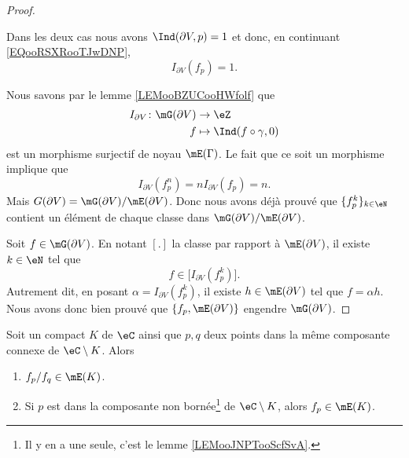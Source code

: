 \begin{proof}
\begin{subproof}
    \end{subproof}
    Dans les deux cas nous avons \( \Ind(\partial V, p)=1\) et donc, en continuant \eqref{EQooRSXRooTJwDNP},
    \begin{equation}
        I_{\partial V}(f_p)=1.
    \end{equation}

    Nous savons par le lemme \ref{LEMooBZUCooHWfolf} que
    \begin{equation}
        \begin{aligned}
            I_{\partial V}\colon \mG(\partial V)&\to \eZ \\
            f&\mapsto \Ind(f\circ \gamma,0) 
        \end{aligned}
    \end{equation}
    est un morphisme surjectif de noyau \( \mE(\Gamma)\). Le fait que ce soit un morphisme implique que
    \begin{equation}
        I_{\partial V}(f_p^n)=nI_{\partial V}(f_p)=n.
    \end{equation}
    Mais \( G(\partial V)=\mG(\partial V)/\mE(\partial V)\). Donc nous avons déjà prouvé que \( \{ f_p^k \}_{k\in \eN}\) contient un élément de chaque classe dans \( \mG(\partial V)/\mE(\partial V)\).

    Soit \( f\in \mG(\partial V)\). En notant \( [.]\) la classe par rapport à \( \mE(\partial V)\), il existe \( k\in \eN\) tel que
    \begin{equation}
        f\in\big[ I_{\partial V}(f_p^k) \big].
    \end{equation}
    Autrement dit, en posant \( \alpha=I_{\partial V}(f_p^k)\), il existe \( h\in \mE(\partial V)\) tel que \( f=\alpha h\). Nous avons donc bien prouvé que \( \{ f_p,\mE(\partial V) \}\) engendre \( \mG(\partial V)\).
\end{proof}

\begin{proposition}       \label{PROPooJNZQooLWDKww}
    Soit un compact \( K\) de \( \eC\) ainsi que \( p,q\) deux points dans la même composante connexe de \( \eC\setminus K\). Alors
    \begin{enumerate}
        \item       \label{ITEMooQMKOooQHhUGn}
            \( f_p/f_q\in\mE(K)\).
        \item
            Si \( p\) est dans la composante non bornée\footnote{Il y en a une seule, c'est le lemme \ref{LEMooJNPTooScfSvA}.} de \( \eC\setminus K\), alors \( f_p\in\mE(K)\).
    \end{enumerate}
\end{proposition}

